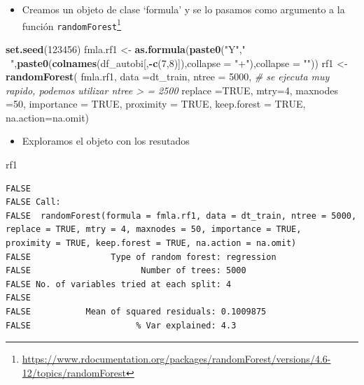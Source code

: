 \documentclass[]{book}
\newenvironment{Shaded}{\begin{snugshade}}{\end{snugshade}}
\newcommand{\CommentTok}[1]{\textcolor[rgb]{0.56,0.35,0.01}{\textit{#1}}}
\newcommand{\DataTypeTok}[1]{\textcolor[rgb]{0.13,0.29,0.53}{#1}}
\newcommand{\DecValTok}[1]{\textcolor[rgb]{0.00,0.00,0.81}{#1}}
\newcommand{\KeywordTok}[1]{\textcolor[rgb]{0.13,0.29,0.53}{\textbf{#1}}}
\newcommand{\NormalTok}[1]{#1}
\newcommand{\OperatorTok}[1]{\textcolor[rgb]{0.81,0.36,0.00}{\textbf{#1}}}
\newcommand{\OtherTok}[1]{\textcolor[rgb]{0.56,0.35,0.01}{#1}}
\newcommand{\StringTok}[1]{\textcolor[rgb]{0.31,0.60,0.02}{#1}}
\providecommand{\tightlist}{%
  \setlength{\itemsep}{0pt}\setlength{\parskip}{0pt}}
\let\rmarkdownfootnote\footnote%
\def\footnote{\protect\rmarkdownfootnote}
\begin{document}
\begin{itemize}
\tightlist
\item
  Creamos un objeto de clase `formula' y se lo pasamos como argumento a la función \texttt{randomForest}\footnote{\url{https://www.rdocumentation.org/packages/randomForest/versions/4.6-12/topics/randomForest}}
\end{itemize}

\begin{Shaded}
\begin{Highlighting}[]
\KeywordTok{set.seed}\NormalTok{(}\DecValTok{123456}\NormalTok{)}
\NormalTok{fmla.rf1 <-}\StringTok{ }\KeywordTok{as.formula}\NormalTok{(}\KeywordTok{paste0}\NormalTok{(}\StringTok{"Y"}\NormalTok{,}\StringTok{" ~"}\NormalTok{,}\KeywordTok{paste0}\NormalTok{(}\KeywordTok{colnames}\NormalTok{(df_autobi[,}\OperatorTok{-}\KeywordTok{c}\NormalTok{(}\DecValTok{7}\NormalTok{,}\DecValTok{8}\NormalTok{)]),}\DataTypeTok{collapse =} \StringTok{"+"}\NormalTok{),}\DataTypeTok{collapse =} \StringTok{""}\NormalTok{))}
\NormalTok{rf1 <-}\StringTok{ }\KeywordTok{randomForest}\NormalTok{( fmla.rf1,}
                       \DataTypeTok{data =}\NormalTok{dt_train,}
                       \DataTypeTok{ntree =} \DecValTok{5000}\NormalTok{, }\CommentTok{# se ejecuta muy rapido, podemos utilizar ntree > = 2500}
                       \DataTypeTok{replace =}\OtherTok{TRUE}\NormalTok{,}
                       \DataTypeTok{mtry=}\DecValTok{4}\NormalTok{,}
                       \DataTypeTok{maxnodes =}\DecValTok{50}\NormalTok{,}
                       \DataTypeTok{importance =} \OtherTok{TRUE}\NormalTok{,}
                       \DataTypeTok{proximity =}   \OtherTok{TRUE}\NormalTok{,}
                       \DataTypeTok{keep.forest =} \OtherTok{TRUE}\NormalTok{,}
                       \DataTypeTok{na.action=}\NormalTok{na.omit)}
\end{Highlighting}
\end{Shaded}

\begin{itemize}
\tightlist
\item
  Exploramos el objeto con los resutados
\end{itemize}

\begin{Shaded}
\begin{Highlighting}[]
\NormalTok{rf1}
\end{Highlighting}
\end{Shaded}

\begin{verbatim}
FALSE 
FALSE Call:
FALSE  randomForest(formula = fmla.rf1, data = dt_train, ntree = 5000,      replace = TRUE, mtry = 4, maxnodes = 50, importance = TRUE,      proximity = TRUE, keep.forest = TRUE, na.action = na.omit) 
FALSE                Type of random forest: regression
FALSE                      Number of trees: 5000
FALSE No. of variables tried at each split: 4
FALSE 
FALSE           Mean of squared residuals: 0.1009875
FALSE                     % Var explained: 4.3
\end{verbatim}
\end{document}
